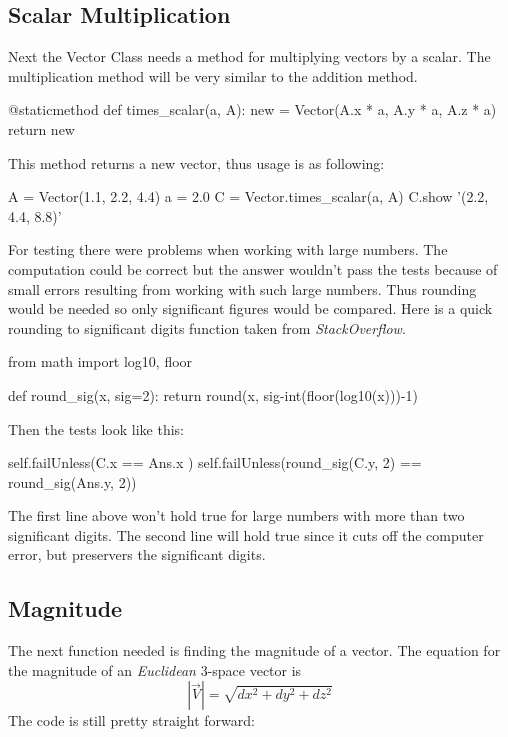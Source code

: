 \documentclass[15pt]{report}
\begin{document}
\subsection{Scalar Multiplication} Next the Vector Class needs a method for multiplying vectors by a scalar. The multiplication method will be very similar to the addition method.

\begin{code}
@staticmethod
def times_scalar(a, A):
    new = Vector(A.x * a, 
                 A.y * a,
                 A.z * a)
    return new
\end{code}

This method returns a new vector, thus usage is as following:

\begin{code}
A = Vector(1.1, 2.2, 4.4)
a = 2.0
C = Vector.times_scalar(a, A)
C.show
'(2.2, 4.4, 8.8)'
\end{code}

For testing there were problems when working with large numbers. The computation could be correct but the answer wouldn't pass the tests because of small errors resulting from working with such large numbers. Thus rounding would be needed so only significant figures would be compared. Here is a quick rounding to significant digits function taken from \textit{StackOverflow}\cite{indgar}.

\begin{code}
from math import log10, floor

def round_sig(x, sig=2):
   return round(x, sig-int(floor(log10(x)))-1)
\end{code}

Then the tests look like this:

\begin{code}
self.failUnless(C.x == Ans.x )            
self.failUnless(round_sig(C.y, 2) == round_sig(Ans.y, 2))
\end{code}

The first line above won't hold true for large numbers with more than two significant digits. The second line will hold true since it cuts off the computer error, but preservers the significant digits.
\subsection{Magnitude} The next function needed is finding the magnitude of a vector. The equation for the magnitude of an \textit{Euclidean} 3-space vector is 
\begin{equation}
\left| \vec{V} \right|  = \sqrt{dx^2 + dy^2 + dz^2}
\end{equation}
The code is still pretty straight forward:
\end{document}
